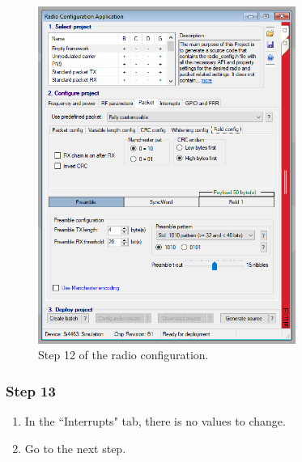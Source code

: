 \begin{figure}[!h]
	\begin{center}
		\includegraphics[width=0.75\textwidth]{figures/wds-tutorial-12.png}
		\caption{Step 12 of the radio configuration.}
		\label{fig:wds-tutorial-step-12}
	\end{center}
\end{figure}

\subsubsection{Step 13}

\begin{enumerate}
    \item In the ``Interrupts" tab, there is no values to change.
    \item Go to the next step.
\end{enumerate}

